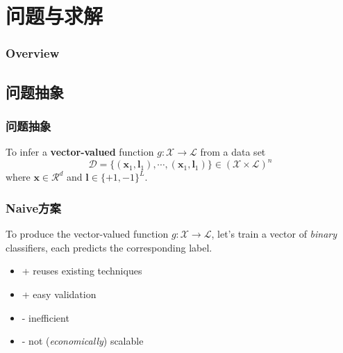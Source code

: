 \documentclass{beamer}
\begin{document}
\section{问题与求解}

\begin{frame}
\frametitle{Overview} %
\tableofcontents[currentsection] %
\end{frame}

\subsection{问题抽象}

\begin{frame}
\frametitle{问题抽象}
To infer a \textbf{vector-valued} function $g : \mathcal{X} \rightarrow \mathcal{L}$ from a data set
$$\mathcal{D} = \{({\mathbf{x}}_1, {\mathbf{l}}_1), \cdots, ({\mathbf{x}}_1, {\mathbf{l}}_1)\} \in (\mathcal{X} \times \mathcal{L})^n$$
where $\mathbf{x} \in \mathcal{R}^d$ and $\mathbf{l} \in {\{+1,-1\}}^L$.
\end{frame}

\begin{frame}
\frametitle{Naive方案}
\begin{block}{}
To produce the vector-valued function $g : \mathcal{X} \rightarrow \mathcal{L}$, let's train a vector of \textit{binary} classifiers, each predicts the corresponding label.
\end{block}

\begin{block}{}
\begin{itemize}
\item + reuses existing techniques
\item + easy validation
\item - inefficient
\item - not (\textit{economically}) scalable
\end{itemize}
\end{block}
\end{frame}
\end{document}

